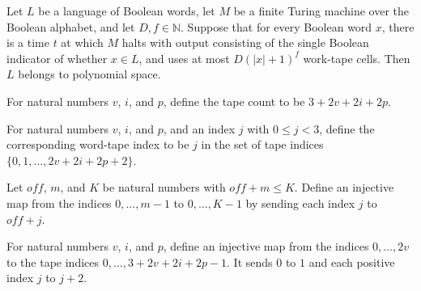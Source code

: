 \begin{theorem}
\label{Complexity.b2b_mem_PSPACE_of_ledger}
\leanok
{}
Let $L$ be a language of Boolean words, let $M$ be a finite Turing machine over the
Boolean alphabet, and let $D,f\in\mathbb{N}$. Suppose that for every Boolean word $x$,
there is a time $t$ at which $M$ halts with output consisting of the single Boolean
indicator of whether $x\in L$, and uses at most $D(|x|+1)^f$ work-tape cells. Then $L$
belongs to polynomial space.
\end{theorem}

\begin{definition}
\label{Complexity.b2b_tapeCount}
\leanok
For natural numbers $v$, $i$, and $p$, define the tape count to be $3+2v+2i+2p$.
\end{definition}

\begin{definition}
\label{Complexity.b2b_wordTape}
\leanok
{}
For natural numbers $v$, $i$, and $p$, and an index $j$ with $0 \le j < 3$, define the
corresponding word-tape index to be $j$ in the set of tape indices
$\{0,1,\ldots,2v+2i+2p+2\}$.
\end{definition}

\begin{definition}
\label{Complexity.b2b_bankEmb}
\leanok
Let $off$, $m$, and $K$ be natural numbers with $off+m\le K$. Define an injective map
from the indices $0,\ldots,m-1$ to $0,\ldots,K-1$ by sending each index $j$ to $off+j$.
\end{definition}

\begin{definition}
\label{Complexity.b2b_callEmb}
\leanok
{}
For natural numbers $v$, $i$, and $p$, define an injective map from the indices
$0,\ldots,2v$ to the tape indices $0,\ldots,3+2v+2i+2p-1$. It sends $0$ to $1$ and each
positive index $j$ to $j+2$.
\end{definition}

